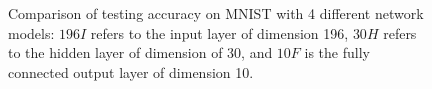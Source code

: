 \documentclass[3p,times,procedia]{elsarticle}
\begin{document}
\begin{figure}[h]
	\centering
	\hspace{-7mm}
	\hspace{-7mm}
	\hspace{-7mm}

	\caption{
		Comparison of testing accuracy on 
		MNIST with 4 different network
		models: 
		$196I$ refers to
		the input layer of dimension 196, 
		$30H$ refers to the hidden layer
		of dimension of 30, and $10F$ is
		the fully connected output layer 
		of dimension 10.
		}
	\label{fig:4}
\end{figure}
\end{document}
